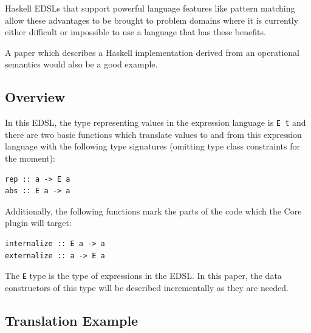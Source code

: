 \documentclass[runningheads, a4paper]{llncs}
\newcommand{\ttt}{\texttt}
\newenvironment{todo}
  {\ifthenelse{\isundefined{\showtodos}}{\comment}{\begin{tcolorbox}
    \textbf{TODO}:}}
  {\ifthenelse{\isundefined{\showtodos}}{\endcomment}{\end{tcolorbox}}
  }
\newenvironment{todont}
               {\comment}
               {\endcomment}
\begin{document}
Haskell EDSLs that support powerful language features like pattern matching
allow these advantages to be brought to problem domains where it is currently
either difficult or impossible to use a language that has these benefits.


\begin{todont}

  A paper which describes a Haskell implementation derived from an operational
  semantics would also be a good example.
\end{todont}

\subsection{Overview}
\label{sec:Overview}

In this EDSL, the type representing values in the expression language is \ttt{E
t} and there are two basic functions which translate values to and from this
expression language with the following type signatures (omitting type class
constraints for the moment):

\begin{lstlisting}
rep :: a -> E a
abs :: E a -> a
\end{lstlisting}

Additionally, the following functions mark the parts of the code which the Core
plugin will target:

\begin{lstlisting}
internalize :: E a -> a
externalize :: a -> E a
\end{lstlisting}

The \ttt{E} type is the type of expressions in the EDSL.  In this paper, the
data constructors of this type will be described incrementally as they
are needed.

\subsection{Translation Example}

\end{document}
